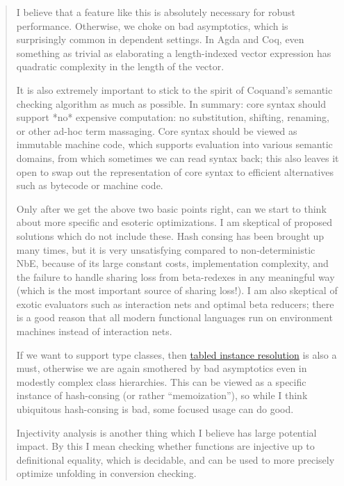 \begin{subappendices}
\begin{quotation}
I believe that a feature like this is absolutely necessary for robust performance. Otherwise, we choke on bad asymptotics, which is surprisingly common in dependent settings. In Agda and Coq, even something as trivial as elaborating a length-indexed vector expression has quadratic complexity in the length of the vector.

It is also extremely important to stick to the spirit of Coquand's semantic checking algorithm as much as possible. In summary: core syntax should support *no* expensive computation: no substitution, shifting, renaming, or other ad-hoc term massaging. Core syntax should be viewed as immutable machine code, which supports evaluation into various semantic domains, from which sometimes we can read syntax back; this also leaves it open to swap out the representation of core syntax to efficient alternatives such as bytecode or machine code.

Only after we get  the above two basic points right, can we start to think about more specific and esoteric optimizations. I am skeptical of proposed solutions which do not include these. Hash consing has been brought up many times, but it is very unsatisfying compared to non-deterministic NbE, because of its large constant costs, implementation complexity, and the failure to handle sharing loss from beta-redexes in any meaningful way (which is the most important source of sharing loss!). I am also skeptical of exotic evaluators such as interaction nets and optimal beta reducers; there is a good reason that all modern functional languages run on environment machines instead of interaction nets.

If we want to support type classes, then \href{https://arxiv.org/pdf/2001.04301.pdf}{tabled instance resolution} \textcite{Tabled2020Selsam} is also a must, otherwise we are again smothered by bad asymptotics even in modestly complex class hierarchies. This can be viewed as a specific instance of hash-consing (or rather ``memoization''), so while I think ubiquitous hash-consing is bad, some focused usage can do good.

Injectivity analysis is another thing which I believe has large potential impact. By this I mean checking whether functions are injective up to definitional equality, which is decidable, and can be used to more precisely optimize unfolding in conversion checking.


\end{quotation}
\end{subappendices}
